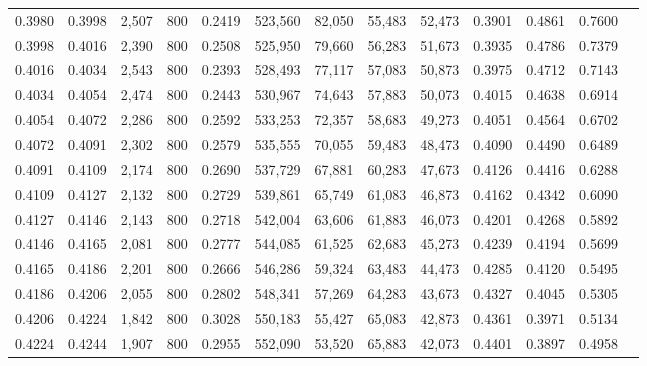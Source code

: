 \begin{tabular}{rrrrrrrrrrrrr}
0.3980 & 0.3998 &  2,507 &   800 &                                     0.2419 & 523,560 &  82,050 &  55,483 &  52,473 & 0.3901 & 0.4861 & 0.7600 \\
0.3998 & 0.4016 &  2,390 &   800 &                                     0.2508 & 525,950 &  79,660 &  56,283 &  51,673 & 0.3935 & 0.4786 & 0.7379 \\
0.4016 & 0.4034 &  2,543 &   800 &                                     0.2393 & 528,493 &  77,117 &  57,083 &  50,873 & 0.3975 & 0.4712 & 0.7143 \\
0.4034 & 0.4054 &  2,474 &   800 &                                     0.2443 & 530,967 &  74,643 &  57,883 &  50,073 & 0.4015 & 0.4638 & 0.6914 \\
0.4054 & 0.4072 &  2,286 &   800 &                                     0.2592 & 533,253 &  72,357 &  58,683 &  49,273 & 0.4051 & 0.4564 & 0.6702 \\
0.4072 & 0.4091 &  2,302 &   800 &                                     0.2579 & 535,555 &  70,055 &  59,483 &  48,473 & 0.4090 & 0.4490 & 0.6489 \\
0.4091 & 0.4109 &  2,174 &   800 &                                     0.2690 & 537,729 &  67,881 &  60,283 &  47,673 & 0.4126 & 0.4416 & 0.6288 \\
0.4109 & 0.4127 &  2,132 &   800 &                                     0.2729 & 539,861 &  65,749 &  61,083 &  46,873 & 0.4162 & 0.4342 & 0.6090 \\
0.4127 & 0.4146 &  2,143 &   800 &                                     0.2718 & 542,004 &  63,606 &  61,883 &  46,073 & 0.4201 & 0.4268 & 0.5892 \\
0.4146 & 0.4165 &  2,081 &   800 &                                     0.2777 & 544,085 &  61,525 &  62,683 &  45,273 & 0.4239 & 0.4194 & 0.5699 \\
0.4165 & 0.4186 &  2,201 &   800 &                                     0.2666 & 546,286 &  59,324 &  63,483 &  44,473 & 0.4285 & 0.4120 & 0.5495 \\
0.4186 & 0.4206 &  2,055 &   800 &                                     0.2802 & 548,341 &  57,269 &  64,283 &  43,673 & 0.4327 & 0.4045 & 0.5305 \\
0.4206 & 0.4224 &  1,842 &   800 &                                     0.3028 & 550,183 &  55,427 &  65,083 &  42,873 & 0.4361 & 0.3971 & 0.5134 \\
0.4224 & 0.4244 &  1,907 &   800 &                                     0.2955 & 552,090 &  53,520 &  65,883 &  42,073 & 0.4401 & 0.3897 & 0.4958 \\

\end{tabular}
